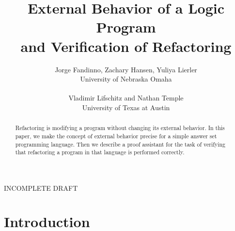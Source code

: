 \documentclass{new_tlp}
\begin{document}
\title{\bf External Behavior of a Logic Program\\
  and Verification of Refactoring}
\author[J. Fandinno, Z. Hansen, Y. Lierler, V. Lifschitz, N. Temple]{Jorge Fandinno, Zachary Hansen, Yuliya Lierler\\
  University of Nebraska Omaha\\ \\
Vladimir Lifschitz and Nathan Temple\\ University of Texas at Austin}
\date{}

\maketitle

\begin{center}INCOMPLETE DRAFT\end{center}

\begin{abstract}
  Refactoring is modifying a program without changing its external behavior.
  In this paper, we
  make the concept of external behavior precise for a simple answer set
  programming language.  Then we describe a proof assistant for the
  task of verifying
  that refactoring a program in that language is performed correctly.
\end{abstract}
  
\section{Introduction}
\end{document}
